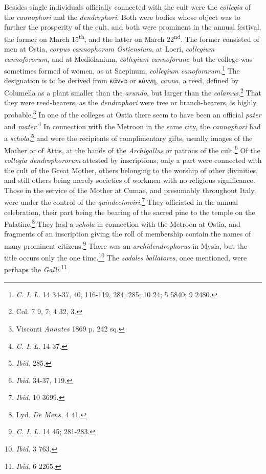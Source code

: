 \documentclass[a4paper, 11pt, oneside, polutonikogreek, english]{article}
\begin{document}
Besides single individuals officially connected with the cult were the \emph{collegia} of the \emph{cannophori} and the \emph{dendrophori}. Both were bodies whose object was to further the prosperity of the cult, and both were prominent in the annual festival, the former on March 15\textsuperscript{th}, and the latter on March 22\textsuperscript{nd}. The former consisted of men at Ostia, \emph{corpus cannophorum Ostiensium}, at Locri, \emph{collegium cannofororum}, and at Mediolanium, \emph{collegium cannoforum}; but the college was sometimes formed of women, as at Saepinum, \emph{collegium canoforarum}.\footnote{\emph{C. I. L.} 14 34-37, 40, 116-119, 284, 285; 10 24; 5 5840; 9 2480.} The designation is to be derived from κάννα or κάννη, \emph{canna}, a reed, defined by Columella as a plant smaller than the \emph{arundo}, but larger than the \emph{calamus}.\footnote{Col. 7 9, 7; 4 32, 3.} That they were reed-bearers, as the \emph{dendrophori} were tree or branch-bearers, is highly probable.\footnote{Visconti \emph{Annates} 1869 p. 242 sq.} In one of the colleges at Ostia there seem to have been an official \emph{pater} and \emph{mater}.\footnote{\emph{C. I. L.} 14 37.} In connection with the Metroon in the same city, the \emph{cannophori} had a \emph{schola},\footnote{\emph{Ibid.} 285.} and were the recipients of complimentary gifts, usually images of the Mother or of Attis, at the hands of the \emph{Archigallus} or patrons of the cult.\footnote{\emph{Ibid.} 34-37, 119.} Of the \emph{collegia dendrophororum} attested by inscriptions, only a part were connected with the cult of the Great Mother, others belonging to the worship of other divinities, and still others being merely societies of workmen with no religious significance. Those in the service of the Mother at Cumae, and presumably throughout Italy, were under the control of the \emph{quindecimviri}.\footnote{\emph{Ibid.} 10 3699.} They officiated in the annual celebration, their part being the bearing of the sacred pine to the temple on the Palatine.\footnote{Lyd. \emph{De Mens.} 4 41.} They had a \emph{schola} in connection with the Metroon at Ostia, and fragments of an inscription giving the roll of membership contain the names of many prominent citizens.\footnote{\emph{C. I. L.} 14 45; 281-283.} There was an \emph{archidendrophorus} in Mysia, but the title occurs only the one time.\footnote{\emph{Ibid.} 3 763.} The \emph{sodales ballatores}, once mentioned, were perhaps the \emph{Galli}.\footnote{\emph{Ibid.} 6 2265.}
\end{document}
